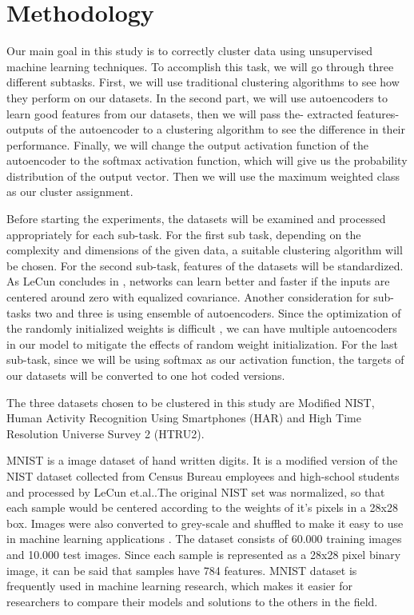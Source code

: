 \documentclass[journal]{IEEEtran}
\begin{document}
\section{Methodology}
Our main goal in this study is to correctly cluster data using unsupervised machine learning techniques.
To accomplish this task, we will go through three different subtasks. First, we will use traditional clustering algorithms 
to see how they perform on our datasets. In the second part, we will use autoencoders to learn good features
from our datasets, then we will pass the- extracted features- outputs of the autoencoder to a clustering algorithm to see the difference
in their performance. Finally, we will change the output activation function of the autoencoder to the softmax 
activation function, which will give us the probability distribution of the output vector. Then we will use
the maximum weighted class as our cluster assignment.\par
Before starting the experiments, the datasets will be examined and processed appropriately for each sub-task.
For the first sub task, depending on the complexity and dimensions of the given data, a suitable clustering algorithm will be chosen.
For the second sub-task, features of the datasets will be standardized. As LeCun concludes in \cite{lecun2012efficient}, networks
can learn better and faster if the inputs are centered around zero with equalized covariance. Another consideration for sub-tasks
two and three is using ensemble of autoencoders. Since the optimization of the randomly initialized weights is 
difficult \cite{hinton2006reducing}, we can have multiple autoencoders in our model to mitigate the effects of random weight initialization.
For the last sub-task, since we will be using softmax as our activation function, the targets of our datasets will be 
converted to one hot coded versions.\par

The three datasets chosen to be clustered in this study are Modified NIST, Human Activity Recognition Using Smartphones (HAR) 
and High Time Resolution Universe Survey 2 (HTRU2).\par

MNIST is a image dataset of hand written digits. It is a modified version of the NIST dataset collected from Census Bureau employees and high-school
students and processed by LeCun et.al..The original NIST set was normalized, so that each sample would be centered
according to the weights of it's pixels in a 28x28 box. Images were also converted to grey-scale and shuffled to make it
easy to use in machine learning applications \cite{lecun1998gradient}. The dataset consists of 60.000 training images and 10.000 test images. Since each
sample is represented as a 28x28 pixel binary image, it can be said that samples have 784 features. MNIST dataset is frequently
used in machine learning research, which makes it easier for researchers to compare their models and solutions to the others
in the field.
\end{document}

